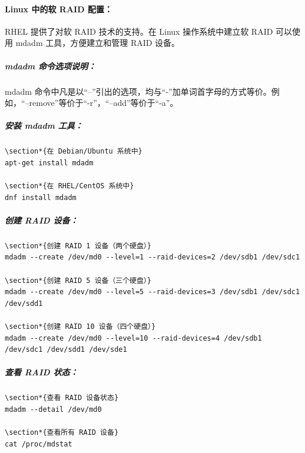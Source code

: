 \documentclass[12pt,UTF8]{ctexbook}
\begin{document}
\paragraph{Linux 中的软 RAID 配置：}
RHEL 提供了对软 RAID 技术的支持。在 Linux 操作系统中建立软 RAID 可以使用 mdadm 工具，方便建立和管理 RAID 设备。

\subparagraph{mdadm 命令选项说明：}
mdadm 命令中凡是以“--”引出的选项，均与“-”加单词首字母的方式等价。例如，“--remove”等价于“-r”，“--add”等价于“-a”。

\subparagraph{安装 mdadm 工具：}
\begin{verbatim}
\section*{在 Debian/Ubuntu 系统中}
apt-get install mdadm

\section*{在 RHEL/CentOS 系统中}
dnf install mdadm
\end{verbatim}

\subparagraph{创建 RAID 设备：}
\begin{verbatim}
\section*{创建 RAID 1 设备（两个硬盘）}
mdadm --create /dev/md0 --level=1 --raid-devices=2 /dev/sdb1 /dev/sdc1

\section*{创建 RAID 5 设备（三个硬盘）}
mdadm --create /dev/md0 --level=5 --raid-devices=3 /dev/sdb1 /dev/sdc1 /dev/sdd1

\section*{创建 RAID 10 设备（四个硬盘）}
mdadm --create /dev/md0 --level=10 --raid-devices=4 /dev/sdb1 /dev/sdc1 /dev/sdd1 /dev/sde1
\end{verbatim}

\subparagraph{查看 RAID 状态：}
\begin{verbatim}
\section*{查看 RAID 设备状态}
mdadm --detail /dev/md0

\section*{查看所有 RAID 设备}
cat /proc/mdstat
\end{verbatim}
\end{document}
